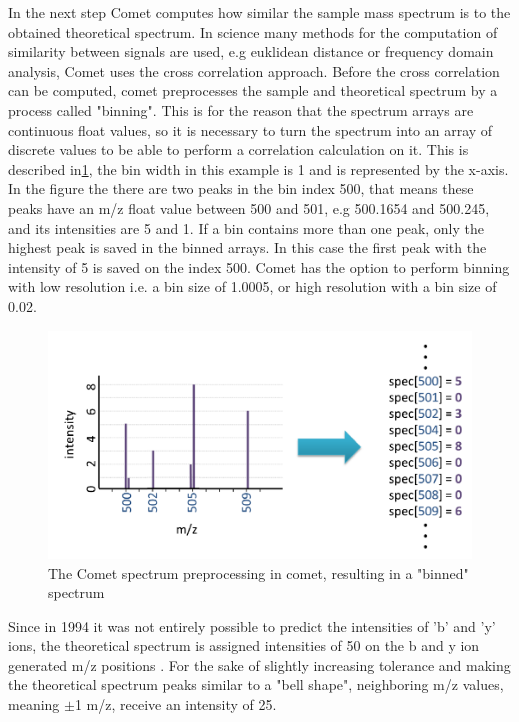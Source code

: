 \documentclass[11pt]{article}
\begin{document}
In the next step Comet computes how similar the sample mass spectrum is to the obtained theoretical spectrum. In science many methods for the computation of similarity between signals are used, e.g euklidean distance or frequency domain analysis, Comet uses the cross correlation approach. Before the cross correlation can be computed, comet preprocesses the sample and theoretical spectrum by a process called "binning". This is for the reason that the spectrum arrays are continuous float values, so it is necessary to turn the spectrum into an array of discrete values to be able to perform a correlation calculation on it. This is described in\cref{fig:binning}, the bin width in this example is 1 and is represented by the x-axis. In the figure the there are two peaks in the bin index 500, that means these peaks have an m/z float value between 500 and 501, e.g 500.1654 and 500.245, and its intensities are 5 and 1. If a bin contains more than one peak, only the highest peak is saved in the binned arrays. In this case the first peak with the intensity of 5 is saved on the index 500. Comet has the option to perform binning with low resolution i.e. a bin size of 1.0005, or high resolution with a bin size of 0.02. 
\begin{figure}[ht]
\centering
\includegraphics[width=1\textwidth]{figs/binning.png}
\caption{The Comet spectrum preprocessing in comet, resulting in a "binned" spectrum \cite{deeper-look-into-comet}}
\label{fig:binning}
\end{figure}
Since in 1994 it was not entirely possible to predict the intensities of 'b' and 'y' ions, the theoretical spectrum is assigned intensities of 50 on the b and y ion generated m/z positions \cite{deeper-look-into-comet}. For the sake of slightly increasing tolerance and making the theoretical spectrum peaks similar to a "bell shape", neighboring m/z values, meaning $\pm$1 m/z, receive an intensity of 25. 
\end{document}
